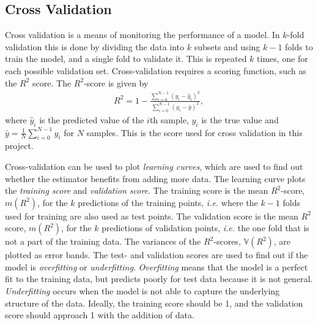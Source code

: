 \documentclass[twoside,english]{uiofysmaster}
\begin{document}
{\subsection{Cross Validation}\label{Sec:: gaussian process : Cross Validation}


Cross validation is a means of monitoring the performance of a model. In $k$-fold validation this is done by dividing the data into $k$ subsets and using $k-1$ folds to train the model, and a single fold to validate it. This is repeated $k$ times, one for each possible validation set. Cross-validation requires a scoring function, such as the $R^2$ score. The $R^2$-score is given by 
\begin{align}
R^2 = 1 - \frac{\sum_{i=0}^{N-1} (y_i - \hat{y}_i)^2}{\sum_{i=0}^{N-1} (y_i - \bar{y})^2},
\end{align}
where $\hat{y}_i$ is the predicted value of the $i$th sample, $y_i$ is the true value and $\bar{y} = \frac{1}{N} \sum_{i = 0}^{N-1} y_i$ for $N$ samples. This is the score used for cross validation in this project.

Cross-validation can be used to plot \textit{learning curves}, which are used to find out whether the estimator benefits from adding more data. The learning curve plots the \textit{training score} and \textit{validation score}. The training score is the mean $R^2$-score, $m(R^2)$, for the $k$ predictions of the training points, \textit{i.e.} where the $k-1$ folds used for training are also used as test points. The validation score is the mean $R^2$ score, $m(R^2)$, for the $k$ predictions of validation points, \textit{i.e.} the one fold that is not a part of the training data. The variances of the $R^2$-scores, $\mathbb{V}(R^2)$, are plotted as error bands. The test- and validation scores are used to find out if the model is \textit{overfitting} or \textit{underfitting}. \textit{Overfitting} means that the model is a perfect fit to the training data, but predicts poorly for test data because it is not general. \textit{Underfitting} occurs when the model is not able to capture the underlying structure of the data. Ideally, the training score should be 1, and the validation score should approach 1 with the addition of data.

}
\end{document}
